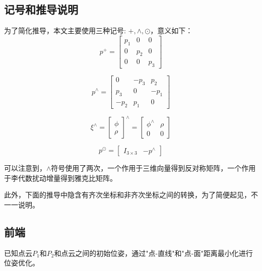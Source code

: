 \documentclass{ctexart}
\begin{document}
{	\subsection{记号和推导说明}
	为了简化推导，本文主要使用三种记号: $+,\wedge,\odot$，意义如下：
	\begin{equation}
	p^+=\begin{bmatrix}
	p_1 & 0 & 0 \\
	0 & p_2 & 0 \\
	0 & 0 & p_3
	\end{bmatrix}
	\end{equation}

	\begin{equation}
	p^\wedge=\begin{bmatrix}
	0 & -p_3 & p_2 \\
	p_3 & 0 & -p_1 \\
	-p_2 & p_1 & 0
	\end{bmatrix}
	\end{equation}

	\begin{equation}
	\xi^\wedge
	=\begin{bmatrix}
	\phi \\ \rho
	\end{bmatrix}^\wedge
	=\begin{bmatrix}
	\phi^\wedge & \rho \\
	0 & 0
	\end{bmatrix}
	\end{equation}

	\begin{equation}
	p^\odot=\begin{bmatrix}
	I_{3\times3} & -p^\wedge
	\end{bmatrix}
	\end{equation}
	
	\par 可以注意到，$\wedge$符号使用了两次，一个作用于三维向量得到反对称矩阵，一个作用于李代数扰动增量得到雅克比矩阵。
	\par 此外，下面的推导中隐含有齐次坐标和非齐次坐标之间的转换，为了简便起见，不一一说明。
	
	\subsection{前端}
	已知点云$P_1$和$P_2$和点云之间的初始位姿，通过"点-直线"和"点-面"距离最小化进行位姿优化。
}
\end{document}
